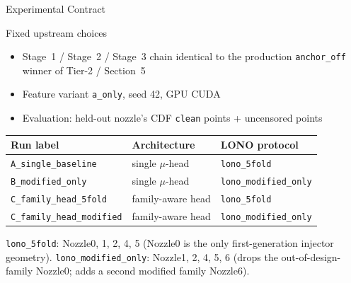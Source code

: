 \documentclass[UTF8,aspectratio=169]{ctexbeamer}
\begin{document}
\begin{frame}{Experimental Contract}
\small
\begin{block}{Fixed upstream choices}
\begin{itemize}\setlength\itemsep{2pt}
  \item Stage~1 / Stage~2 / Stage~3 chain identical to the production
        \texttt{anchor\_off} winner of Tier-2 / Section~5
  \item Feature variant \texttt{a\_only}, seed 42, GPU CUDA
  \item Evaluation: held-out nozzle's CDF \texttt{clean} points + uncensored points
\end{itemize}
\end{block}

\vspace{0.35em}
\begin{center}
\renewcommand{\arraystretch}{1.18}
\setlength{\tabcolsep}{4pt}
\begin{tabular}{@{}L{4.6cm}L{4.0cm}L{4.8cm}@{}}
\toprule
\textbf{Run label} & \textbf{Architecture} & \textbf{LONO protocol} \\
\midrule
\texttt{A\_single\_baseline}      & single $\mu$-head    & \texttt{lono\_5fold} \\
\texttt{B\_modified\_only}        & single $\mu$-head    & \texttt{lono\_modified\_only} \\
\texttt{C\_family\_head\_5fold}    & family-aware head    & \texttt{lono\_5fold} \\
\texttt{C\_family\_head\_modified} & family-aware head    & \texttt{lono\_modified\_only} \\
\bottomrule
\end{tabular}
\end{center}

\vspace{0.3em}
\footnotesize
\texttt{lono\_5fold}: Nozzle0, 1, 2, 4, 5 (Nozzle0 is the only first-generation
injector geometry). \texttt{lono\_modified\_only}: Nozzle1, 2, 4, 5, 6 (drops the
out-of-design-family Nozzle0; adds a second modified family Nozzle6).
\end{frame}
\end{document}
